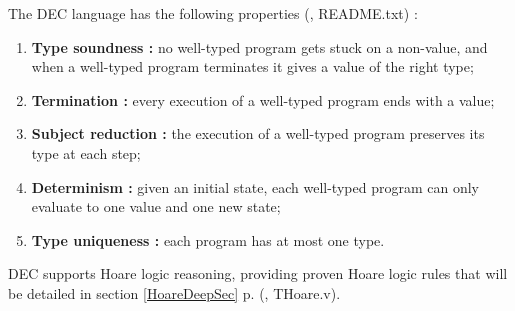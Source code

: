 \noindent The DEC language has the following properties (\cite{DEC}, README.txt) : 
\begin{enumerate}
	\item \textbf{Type soundness :} no well-typed program gets stuck on a
non-value, and when a well-typed program terminates it gives a value
of the right type;
	\item \textbf{Termination :} every execution of a well-typed program
ends with a value;
	\item \textbf{Subject reduction :} the execution of a well-typed
program preserves its type at each step;
	\item \textbf{Determinism :} given an initial state, each well-typed
program can only evaluate to one value and one new state;
	\item \textbf{Type uniqueness :} each program has at most one
type.	
\end{enumerate}
DEC supports Hoare logic reasoning, providing proven Hoare logic rules that will be detailed in section \ref{HoareDeepSec} p.\pageref{HoareDeepSec} (\cite{DEC}, THoare.v).

